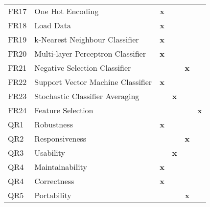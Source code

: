 \begin{table}[H]
\begin{adjustbox}{center=\textwidth}
\begin{tabular}{@{}llcccc@{}}
FR17 & One Hot Encoding                  & \textbf{x} & \textbf{} & \textbf{} & \textbf{} \\
FR18 & Load Data                         & \textbf{x} & \textbf{} & \textbf{} & \textbf{} \\
FR19 & k-Nearest Neighbour Classifier    & \textbf{x} & \textbf{} & \textbf{} & \textbf{} \\
FR20 & Multi-layer Perceptron Classifier & \textbf{x} & \textbf{} & \textbf{} & \textbf{} \\
FR21 & Negative Selection Classifier     & \textbf{} & \textbf{} & \textbf{x} & \textbf{} \\
FR22 & Support Vector Machine Classifier & \textbf{x} & \textbf{} & \textbf{} & \textbf{} \\
FR23 & Stochastic Classifier Averaging   & \textbf{} & \textbf{x} & \textbf{} & \textbf{} \\
FR24 & Feature Selection                 & \textbf{} & \textbf{} & \textbf{} & \textbf{x} \\
QR1 & Robustness                         & \textbf{x} & \textbf{} & \textbf{} & \textbf{} \\
QR2 & Responsiveness                     & \textbf{} & \textbf{} & \textbf{x} & \textbf{} \\
QR3 & Usability                          & \textbf{} & \textbf{x} & \textbf{} & \textbf{} \\
QR4 & Maintainability                    & \textbf{x} & \textbf{} & \textbf{} & \textbf{} \\
QR4 & Correctness                        & \textbf{x} & \textbf{} & \textbf{} & \textbf{} \\
QR5 & Portability                        & \textbf{} & \textbf{} & \textbf{x} & \textbf{} \\ \bottomrule
\end{tabular}
\end{adjustbox}
\end{table}
